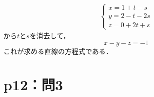 \begin{tanswer}
  \begin{align*}
    \begin{cases}
      x=1+t-s   \\
      y=2-t -2s \\
      z=0+2t+s
    \end{cases}
  \end{align*}
  から$t$と$s$を消去して，
  \[
    x-y-z=-1
  \]
  これが求める直線の方程式である．
\end{tanswer}

\section*{p12：問3}

